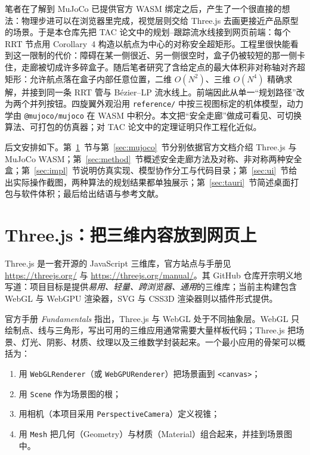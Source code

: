 \documentclass[UTF8,a4paper,11pt,zihao=-4]{ctexart}
\begin{document}
笔者在了解到 MuJoCo 已提供官方 WASM 绑定\cite{mujoco-wasm}之后，产生了一个很直接的想法：物理步进可以在浏览器里完成，视觉层则交给 Three.js 去画更接近产品原型的场景。于是本仓库先把 TAC 论文中的规划--跟踪流水线接到网页前端：每个 RRT 节点用 Corollary~4 构造以航点为中心的对称安全超矩形。工程里很快能看到这一限制的代价：障碍在某一侧很近、另一侧很空时，盒子仍被较短的那一侧卡住，走廊被切成许多碎盒子。随后笔者研究了含给定点的最大体积非对称轴对齐超矩形\cite{zhu2026asymmetric}：允许航点落在盒子内部任意位置，二维 $O(N^2)$、三维 $O(N^4)$ 精确求解，并接到同一条 RRT 管与 B\'ezier--LP 流水线上。前端因此从单一``规划路径''改为两个并列按钮。四旋翼外观沿用 \texttt{reference/} 中按三视图标定的机体模型，动力学由 \texttt{@mujoco/mujoco} 在 WASM 中积分。本文把``安全走廊''做成可看见、可切换算法、可打包的仿真器；对 TAC 论文中的定理证明只作工程化近似。

后文安排如下。第~\ref{sec:three}~节与第~\ref{sec:mujoco}~节分别依据官方文档介绍 Three.js 与 MuJoCo WASM；第~\ref{sec:method}~节概述安全走廊方法及对称、非对称两种安全盒；第~\ref{sec:impl}~节说明仿真实现、模型协作分工与代码目录；第~\ref{sec:ui}~节给出实际操作截图，两种算法的规划结果都单独展示；第~\ref{sec:tauri}~节简述桌面打包与软件体积；最后给出结语与参考文献。

\section{Three.js：把三维内容放到网页上}
\label{sec:three}

Three.js 是一套开源的 JavaScript 三维库，官方站点与手册见 \url{https://threejs.org/} 与 \url{https://threejs.org/manual/}\cite{threejs,threejs-manual}。其 GitHub 仓库开宗明义地写道：项目目标是提供\emph{易用、轻量、跨浏览器、通用}的三维库；当前主构建包含 WebGL 与 WebGPU 渲染器，SVG 与 CSS3D 渲染器则以插件形式提供。

官方手册 \emph{Fundamentals} 指出，Three.js 与 WebGL 处于不同抽象层。WebGL 只绘制点、线与三角形，写出可用的三维应用通常需要大量样板代码；Three.js 把场景、灯光、阴影、材质、纹理以及三维数学封装起来。一个最小应用的骨架可以概括为：

\begin{enumerate}
  \item 用 \texttt{WebGLRenderer}（或 \texttt{WebGPURenderer}）把场景画到 \texttt{<canvas>}；
  \item 用 \texttt{Scene} 作为场景图的根；
  \item 用相机（本项目采用 \texttt{PerspectiveCamera}）定义视锥；
  \item 用 \texttt{Mesh} 把几何（Geometry）与材质（Material）组合起来，并挂到场景图中。
\end{enumerate}
\end{document}
